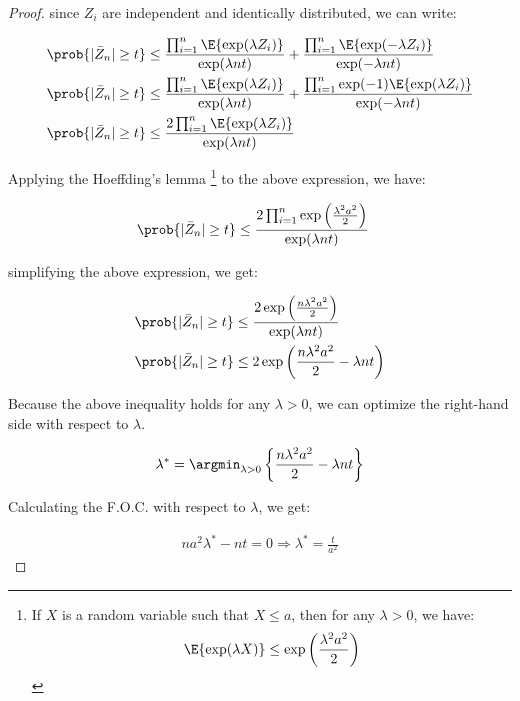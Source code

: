 \begin{proof}
since $Z_i$ are independent and identically distributed, we can write:

\begin{align*}
\prob{|\bar{Z}_n| \geq t} &\leq
    \frac{\prod_{i=1}^n \E{\exp(\lambda Z_i)}}{\exp(\lambda nt)} + 
    \frac{\prod_{i=1}^n \E{\exp(-\lambda Z_i)}}{\exp(-\lambda nt)}\\
\prob{|\bar{Z}_n| \geq t} &\leq
    \frac{\prod_{i=1}^n \E{\exp(\lambda Z_i)}}{\exp(\lambda nt)} + 
    \frac{\prod_{i=1}^n \exp(-1)\E{\exp(\lambda Z_i)}}{\exp(-\lambda nt)}\\
\prob{|\bar{Z}_n| \geq t} &\leq
    \frac{2 \prod_{i=1}^n \E{\exp(\lambda Z_i)}}{\exp(\lambda nt)} 
\end{align*}

Applying the Hoeffding's lemma \footnote{
    If $X$ is a random variable such that $X \leq a$, then for any $\lambda > 0$, we have:
    \begin{align*}
    \E{\exp(\lambda X)} \leq \exp\left(\frac{\lambda^2a^2}{2}\right)
    \end{align*}
} to the above expression, we have:

\begin{align*}
\prob{|\bar{Z}_n| \geq t} &\leq
    \frac{ 2 \prod_{i = 1}^n \exp\left(\frac{\lambda^2a^2}{2}\right)}{\exp(\lambda nt)} 
\end{align*}

simplifying the above expression, we get:

\begin{align*}
\prob{|\bar{Z}_n| \geq t} &\leq
    \frac{2 \exp\left(\frac{n\lambda^2a^2}{2}\right)}{\exp(\lambda nt)}\\
\prob{|\bar{Z}_n| \geq t} &\leq
    2 \exp\left(\frac{n\lambda^2a^2}{2} - \lambda nt \right)\\
\end{align*}

Because the above inequality holds for any $\lambda > 0$, we can optimize the right-hand side with respect to $\lambda$.

\begin{align*}
\lambda^* = \argmin_{\lambda > 0} \left\{ \frac{n\lambda^2a^2}{2} - \lambda nt \right\}
\end{align*}

Calculating the F.O.C. with respect to $\lambda$, we get:

\begin{align*}
n a^2 \lambda^* - nt = 0 \Rightarrow \lambda^* = \frac{t}{a^2}
\end{align*}


\end{proof}
